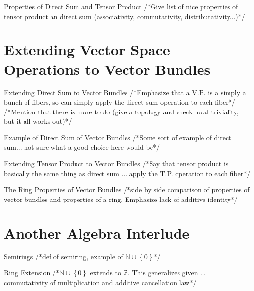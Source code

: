 \documentclass[12pt]{beamer}
\newcommand{\toadd}[1]{/*#1*/}
\newcommand{\set}[1]{\left\{#1\right\}}
\newcommand{\N}{\mathbb{N}}
\newcommand{\Z}{\mathbb{Z}}
\begin{document}
\begin{frame}{Properties of Direct Sum and Tensor Product}
	\toadd{Give list of nice properties of tensor product an direct sum (associativity, commutativity, distributativity...)}
\end{frame}

\section{Extending Vector Space Operations to Vector Bundles}

\begin{frame}{Extending Direct Sum to Vector Bundles}
	\toadd{Emphasize that a V.B. is a simply a bunch of fibers, so can simply apply the direct sum operation to each fiber}
	\toadd{Mention that there is more to do (give a topology and check local triviality, but it all works out)}
\end{frame}

\begin{frame}{Example of Direct Sum of Vector Bundles}
	\toadd{Some sort of example of direct sum... not sure what a good choice here would be}
\end{frame}

\begin{frame}{Extending Tensor Product to Vector Bundles}
	\toadd{Say that tensor product is basically the same thing as direct sum ... apply the T.P. operation to each fiber}
\end{frame}

\begin{frame}{The Ring Properties of Vector Bundles}
	\toadd{side by side comparison of properties of vector bundles and properties of a ring. Emphasize lack of additive identity}
\end{frame}

\section{Another Algebra Interlude}

\begin{frame}{Semirings}
	\toadd{def of semiring, example of $\N \cup \set{0}$}
\end{frame}

\begin{frame}{Ring Extension}
	\toadd{$\N \cup \set{0}$ extends to $\Z$. This generalizes given ... commutativity of multiplication and additive cancellation law}
\end{frame}
\end{document}
